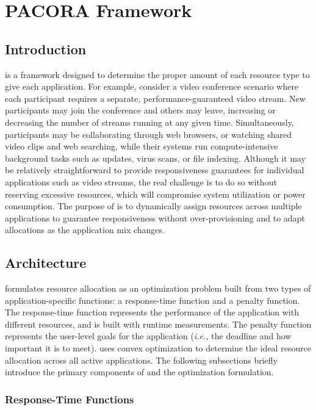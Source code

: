 \chapter{PACORA Framework}

\section{Introduction}

\pacora is a framework designed to determine the proper amount of each
resource type to give each application.  For example, consider a video
conference scenario where each participant requires a separate,
performance-guaranteed video stream.  New participants may join the
conference and others may leave, increasing or decreasing the number
of streams running at any given time.  Simultaneously, participants
may be collaborating through web browsers, or watching shared video
clips and web searching, while their systems run compute-intensive
background tasks such as updates, virus scans, or file indexing.
Although it may be relatively straightforward to provide
responsiveness guarantees for individual applications such as video
streams, the real challenge is to do so without reserving excessive
resources, which will compromise system utilization or power
consumption. The purpose of \pacora is to dynamically assign resources
across multiple applications to guarantee responsiveness without
over-provisioning and to adapt allocations as the application mix
changes.

\section{\pacora Architecture}\label{sys_design}

\pacora formulates resource allocation as an optimization problem
built from two types of application-specific functions: a
response-time function and a penalty function. The response-time
function represents the performance of the application with different
resources, and is built with runtime measurements.  The penalty
function represents the user-level goals for the application
(\emph{i.e.,} the deadline and how important it is to meet). \pacora uses convex optimization\cite{BoVa} to
determine the ideal resource allocation across all active
applications.  The following subsections briefly introduce the primary
components of \pacora and the optimization formulation.

\subsection{Response-Time Functions}

